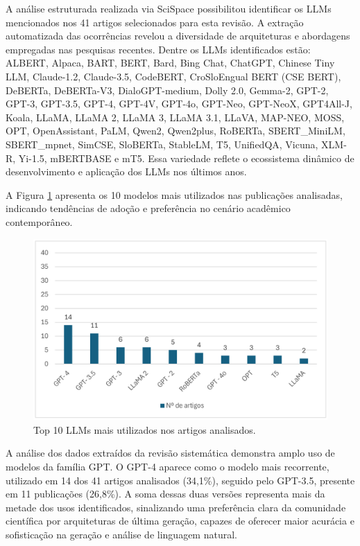 \documentclass[portuguese]{textolivre}
\begin{document}
A análise estruturada realizada via SciSpace possibilitou identificar os LLMs mencionados nos 41 artigos selecionados para esta revisão. A extração automatizada das ocorrências revelou a diversidade de arquiteturas e abordagens empregadas nas pesquisas recentes. Dentre os LLMs identificados estão: 
ALBERT, Alpaca, BART, BERT, Bard, Bing Chat, ChatGPT,
Chinese Tiny LLM, Claude-1.2, Claude-3.5, CodeBERT,
CroSloEngual BERT (CSE BERT), DeBERTa, DeBERTa-V3,
DialoGPT-medium, Dolly 2.0, Gemma-2,
GPT-2, GPT-3, GPT-3.5, GPT-4, GPT-4V, GPT-4o,
GPT-Neo, GPT-NeoX, GPT4All-J, Koala,
LLaMA, LLaMA 2, LLaMA 3, LLaMA 3.1, LLaVA,
MAP-NEO, MOSS, OPT, OpenAssistant, PaLM,
Qwen2, Qwen2\text{-}plus, RoBERTa, SBERT\_MiniLM, SBERT\_mpnet, 
SimCSE, SloBERTa, StableLM, T5, UnifiedQA, Vicuna, XLM-R, Yi-1.5,
mBERTBASE e mT5. Essa variedade reflete o ecossistema dinâmico de desenvolvimento e aplicação dos LLMs nos últimos anos.

A Figura \ref{fig-5} apresenta os 10 modelos mais utilizados nas publicações analisadas, indicando tendências de adoção e preferência no cenário acadêmico contemporâneo.

\begin{figure}[htbp]
\centering
\begin{minipage}{0.75\textwidth}
\includegraphics[width=\textwidth]{Imagens/fig-005.png}
\caption{Top 10 LLMs mais utilizados nos artigos analisados.}
\label{fig-5}
\end{minipage}
\end{figure}

A análise dos dados extraídos da revisão sistemática demonstra amplo uso de modelos da família GPT. O GPT-4 aparece como o modelo mais recorrente, utilizado em 14 dos 41 artigos analisados (34,1\%), seguido pelo GPT-3.5, presente em 11 publicações (26,8\%). A soma dessas duas versões representa mais da metade dos usos identificados, sinalizando uma preferência clara da comunidade científica por arquiteturas de última geração, capazes de oferecer maior acurácia e sofisticação na geração e análise de linguagem natural.
\end{document}
